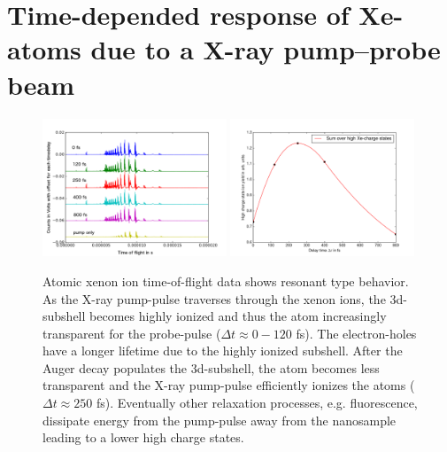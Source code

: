 \section{Time-depended response of Xe-atoms due to a X-ray pump--probe beam}\label{sec:time-resolved-xe-atoms}
\begin{figure}
	\centering
		\includegraphics[width=0.49\textwidth]{images/results/TOF-atomic-xenon.png}
		\includegraphics[width=0.49\textwidth]{images/results/atomic-charge-state-time-resolved.pdf}
	\caption[Time-resolved answer of atomic xenon in TOF spectroscopy.]{Atomic xenon ion time-of-flight data shows resonant type behavior. As the X-ray pump-pulse traverses through the xenon ions, the 3d-subshell becomes highly ionized and thus the atom increasingly transparent for the probe-pulse ($\Delta t \approx 0-120$ fs). The electron-holes have a longer lifetime due to the highly ionized subshell. After the Auger decay populates the 3d-subshell, the atom becomes less transparent and the X-ray pump-pulse efficiently ionizes the atoms ($\Delta t \approx 250$ fs). Eventually other relaxation processes, e.g. fluorescence, dissipate energy from the pump-pulse away from the nanosample leading to a lower high charge states.}
	\label{fig:TOF-atomic-xenon}
\end{figure}
